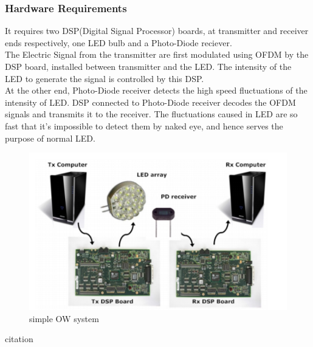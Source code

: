 \documentclass{article}
\begin{document}
\subsubsection{Hardware Requirements}
It requires two DSP(Digital Signal Processor) boards, at transmitter and receiver ends respectively, one LED bulb and a Photo-Diode reciever.\\
The Electric Signal from the transmitter are first modulated using OFDM by the DSP board, installed between transmitter and the LED. The intensity of the LED to generate the signal is controlled by this DSP.\\
At the other end, Photo-Diode receiver detects the high speed fluctuations of the intensity of LED. DSP connected to Photo-Diode receiver decodes the OFDM signals and transmits it to the receiver. The fluctuations caused in LED are so fast that it's impossible to detect them by naked eye, and hence serves the purpose of normal LED.
\begin{figure}[!h]
  \includegraphics[width=\linewidth]{res/hardware_li_fi.PNG}
    \caption{simple OW system}
  \label{fig:hardware_li_fi}
\end{figure}
citation
\end{document}
